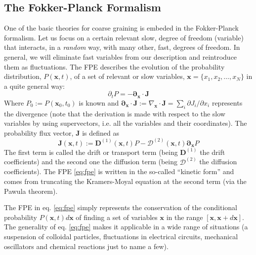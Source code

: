 \documentclass[ twoside,openright,titlepage,numbers=noenddot,%
headinclude,footinclude,cleardoublepage=empty,abstract=on,
BCOR=5mm,paper=a4,fontsize=11pt, dvipsnames
]{scrreprt}
\renewcommand{\vec}[1]{\bm{#1}}
\newcommand{\tens}[1]{\bm{\mathcal{#1}}}
\begin{document}
\subsection{The Fokker-Planck Formalism}\label{sec:fpe}
One of the basic theories for coarse graining is embeded in the Fokker-Planck formalism. Let us focus on a certain relevant slow, degree of freedom (variable) that interacts, in a \emph{random} way, with many other, fast, degrees of freedom. In general, we will eliminate fast variables from our description and reintroduce them as fluctuations. The \gls{FPE} describes the evolution of the probability distribution, $P(\vec{x},t)$, of a set of relevant or slow variables, $\vec{x} = \{x_1, x_2,\dots, x_N\}$ in a quite general way:
  \begin{equation}
    \label{eq:fpe}
    \partial_t P = -\vec{\partial}_{\vec{x}}\cdot \vec{J}
  \end{equation}
Where $P_0 := P(\vec{x}_0, t_0)$ is known and $\vec{\partial}_{\vec{x}}\cdot \vec{J} := \nabla_{\vec{x}}\cdot\vec{J} = \sum_i\partial J_i/\partial x_i  $ represents the divergence (note that the derivation is made with respect to the slow variables by using supervectors, i.e. all the variables and their coordinates\cite{Dhont1996}).
The probability flux vector, $\vec{J}$ is defined as
\begin{equation}
  \label{eq:fpeflux}
  \vec{J}(\vec{x}, t) := \vec{D}^{(1)}(\vec{x},t)P - \tens{D}^{(2)}(\vec{x}, t) \vec{\partial}_{\vec{x}} P
\end{equation}
The first term is called the drift or transport term (being $\vec{D}^{(1)}$ the drift coefficients) and the second one the diffusion term (being $\tens{D}^{(2)}$ the diffusion coefficients). The \gls{FPE} \eqref{eq:fpe} is written in the so-called ``kinetic form'' and comes from truncating the Kramers-Moyal equation at the second term (via the Pawula theorem)\cite{Risken2012}.

%
The \gls{FPE} in eq. \eqref{eq:fpe} simply represents the conservation of the conditional probability $P(\vec{x},t)d\vec{x}$ of finding a set of variables $\vec{x}$ in the range $[\vec{x}, \vec{x} + d\vec{x}]$. The generality of eq. \eqref{eq:fpe} makes it applicable in a wide range of situations (a suspension of colloidal particles, fluctuations in electrical circuits, mechanical oscillators and chemical reactions just to name a few).
\end{document}
